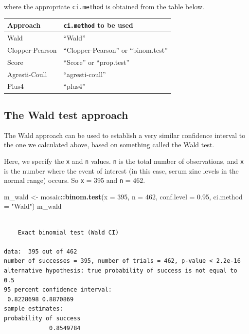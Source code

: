 \documentclass[
]{book}
\newenvironment{Shaded}{\begin{snugshade}}{\end{snugshade}}
\newcommand{\DataTypeTok}[1]{\textcolor[rgb]{0.13,0.29,0.53}{#1}}
\newcommand{\DecValTok}[1]{\textcolor[rgb]{0.00,0.00,0.81}{#1}}
\newcommand{\FloatTok}[1]{\textcolor[rgb]{0.00,0.00,0.81}{#1}}
\newcommand{\KeywordTok}[1]{\textcolor[rgb]{0.13,0.29,0.53}{\textbf{#1}}}
\newcommand{\NormalTok}[1]{#1}
\newcommand{\OperatorTok}[1]{\textcolor[rgb]{0.81,0.36,0.00}{\textbf{#1}}}
\newcommand{\StringTok}[1]{\textcolor[rgb]{0.31,0.60,0.02}{#1}}
\begin{document}
where the appropriate \texttt{ci.method} is obtained from the table below.

\begin{longtable}[]{@{}ll@{}}
\toprule
Approach & \texttt{ci.method} to be used\tabularnewline
\midrule
\endhead
Wald & ``Wald''\tabularnewline
Clopper-Pearson & ``Clopper-Pearson'' or ``binom.test''\tabularnewline
Score & ``Score'' or ``prop.test''\tabularnewline
Agresti-Coull & ``agresti-coull''\tabularnewline
Plus4 & ``plus4''\tabularnewline
\bottomrule
\end{longtable}

\hypertarget{the-wald-test-approach}{%
\subsection{The Wald test approach}\label{the-wald-test-approach}}

The Wald approach can be used to establish a very similar confidence interval to the one we calculated above, based on something called the Wald test.

Here, we specify the \texttt{x} and \texttt{n} values. \texttt{n} is the total number of observations, and \texttt{x} is the number where the event of interest (in this case, serum zinc levels in the normal range) occurs. So \texttt{x} = 395 and \texttt{n} = 462.

\begin{Shaded}
\begin{Highlighting}[]
\NormalTok{m_wald <-}\StringTok{ }\NormalTok{mosaic}\OperatorTok{::}\KeywordTok{binom.test}\NormalTok{(}\DataTypeTok{x =} \DecValTok{395}\NormalTok{, }\DataTypeTok{n =} \DecValTok{462}\NormalTok{,}
                     \DataTypeTok{conf.level =} \FloatTok{0.95}\NormalTok{,}
                     \DataTypeTok{ci.method =} \StringTok{"Wald"}\NormalTok{)}
\NormalTok{m_wald}
\end{Highlighting}
\end{Shaded}

\begin{verbatim}

	Exact binomial test (Wald CI)

data:  395 out of 462
number of successes = 395, number of trials = 462, p-value < 2.2e-16
alternative hypothesis: true probability of success is not equal to 0.5
95 percent confidence interval:
 0.8228698 0.8870869
sample estimates:
probability of success 
             0.8549784 
\end{verbatim}
\end{document}
